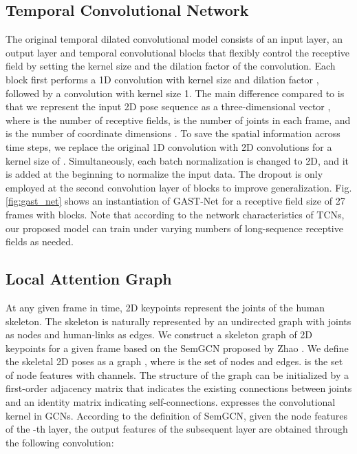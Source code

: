 \documentclass[letterpaper, 10 pt, conference, twoside]{ieeeconf}
\begin{document}
\subsection{Temporal Convolutional Network}\label{subsec:TempConvs}
The original temporal dilated convolutional model  \cite{pavllo20193d} consists of an input layer, an output layer and  temporal convolutional blocks that flexibly control the receptive field by setting the kernel size and the dilation factor of the convolution. Each block first performs a 1D convolution with kernel size  and dilation factor , followed by a convolution with kernel size 1. The main difference compared to \cite{pavllo20193d} is that we represent the input 2D pose sequence as a three-dimensional vector , where  is the number of receptive fields,  is the number of joints in each frame, and  is the number of coordinate dimensions . To save the spatial information across time steps, we replace the original 1D convolution with 2D convolutions for a kernel size of . Simultaneously, each batch normalization is changed to 2D, and it is added at the beginning to normalize the input data. The dropout is only employed at the second convolution layer of blocks to improve generalization. Fig. \ref{fig:gast_net} shows an instantiation of GAST-Net for a receptive field size of 27 frames with  blocks. Note that according to the network characteristics of TCNs, our proposed model can train under varying numbers of long-sequence receptive fields as needed.
\subsection{Local Attention Graph}\label{subsec:localGCNs}
At any given frame in time, 2D keypoints represent the joints of the human skeleton. The skeleton is naturally represented by an undirected graph with joints as nodes and human-links as edges. We construct a skeleton graph of 2D keypoints for a given frame based on the SemGCN proposed by Zhao \cite{zhao2019semantic}. We define the skeletal 2D poses as a graph , where  is the set of  nodes and  edges.  is the set of node features with  channels. The structure of the graph can be initialized by a first-order adjacency matrix  that indicates the existing connections between joints and an identity matrix  indicating self-connections.  expresses the convolutional kernel in GCNs. According to the definition of SemGCN, given the node features of the -th layer, the output features of the subsequent layer are obtained through the following convolution:
\end{document}
